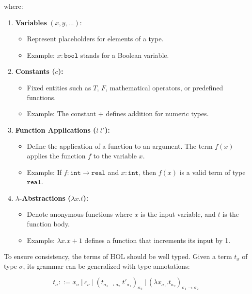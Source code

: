 where:
\begin{enumerate}
    \item \textbf{Variables} $(x, y, \ldots):$
    \begin{itemize}
        \item Represent placeholders for elements of a type.
        \item Example: $x : \texttt{bool}$ stands for a Boolean variable.
    \end{itemize}

    \item \textbf{Constants ($c$):}
    \begin{itemize}
        \item Fixed entities such as $T$, $F$, mathematical operators, or predefined functions.
        \item  Example: The constant $+$ defines addition for numeric types.
    \end{itemize}

   \item \textbf{Function Applications ($t \ t'$):}
   \begin{itemize}
       \item Define the application of a function to an argument. The term $f(x)$ applies the function $f$ to the variable $x$.
        \item Example: If $f : \texttt{int} \to \texttt{real}$ and $x : \texttt{int}$, then $f(x)$ is a valid term of type $\texttt{real}$.
   \end{itemize}

\item \textbf{$\lambda$-Abstractions ($\lambda x. t$):}
\begin{itemize}
    \item Denote anonymous functions where $x$ is the input variable, and $t$ is the function body.
    \item Example: $\lambda x. x + 1$ defines a function that increments its input by 1.
\end{itemize}


\end{enumerate}

To ensure consistency, the terms of HOL should be well typed. Given a term $t_{\sigma}$ of type $\sigma$, its grammar can be generalized with type annotations:

\[
t_{\sigma} ::= x_{\sigma} \ | \ c_{\sigma} \ | \ (t_{\sigma_1 \to \sigma_2} \ t'_{\sigma_1})_{\sigma_2} \ | \ (\lambda x_{\sigma_1}. t_{\sigma_2})_{\sigma_1 \to \sigma_2}
\]

